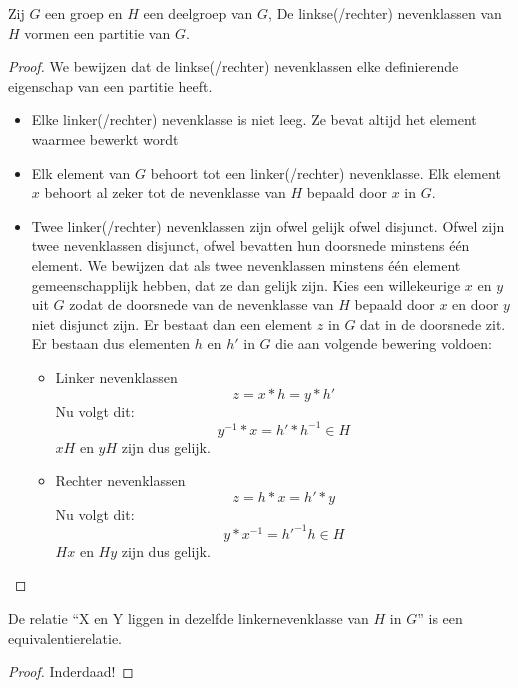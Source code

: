 \documentclass[main.tex]{subfiles}
\begin{document}
\begin{st}
  Zij $G$ een groep en $H$ een deelgroep van $G$, De linkse(/rechter) nevenklassen van $H$ vormen een partitie van $G$.

  \begin{proof}
    We bewijzen dat de linkse(/rechter) nevenklassen elke definierende eigenschap van een partitie heeft.
    \begin{itemize}
    \item Elke linker(/rechter) nevenklasse is niet leeg. Ze bevat altijd het element waarmee bewerkt wordt
    \item Elk element van $G$ behoort tot een linker(/rechter) nevenklasse.
      Elk element $x$ behoort al zeker tot de nevenklasse van $H$ bepaald door $x$ in $G$.
    \item Twee linker(/rechter) nevenklassen zijn ofwel gelijk ofwel disjunct.
      Ofwel zijn twee nevenklassen disjunct, ofwel bevatten hun doorsnede minstens \'e\'en element.
      We bewijzen dat als twee nevenklassen minstens \'e\'en element gemeenschapplijk hebben, dat ze dan gelijk zijn.
      Kies een willekeurige $x$ en $y$ uit $G$ zodat de doorsnede van de nevenklasse van $H$ bepaald door $x$ en door $y$ niet disjunct zijn.
      Er bestaat dan een element $z$ in $G$ dat in de doorsnede zit.
      Er bestaan dus elementen $h$ en $h'$ in $G$ die aan volgende bewering voldoen:
      \begin{itemize}
      \item Linker nevenklassen
        \[ z = x*h = y*h' \]
        Nu volgt dit:
        \[ y^{-1}*x = h'*h^{-1} \in H \]
        $xH$ en $yH$ zijn dus gelijk.
      \item Rechter nevenklassen
        \[ z = h*x = h'*y \]
        Nu volgt dit:
        \[ y*x^{-1} = h'^{-1}h \in H \]
        $Hx$ en $Hy$ zijn dus gelijk.
      \end{itemize}
    \end{itemize}
  \end{proof}
\end{st}

\begin{gev}
  De relatie ``X en Y liggen in dezelfde linkernevenklasse van $H$ in $G$'' is een equivalentierelatie.
  \begin{proof}
    Inderdaad!
  \end{proof}
\end{gev}
\end{document}
